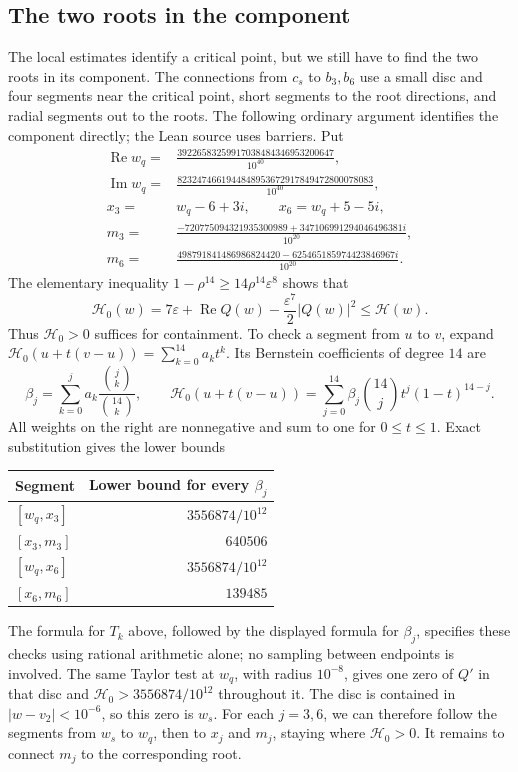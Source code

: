 \subsection{The two roots in the component}\label{subsec:counterexample-connections}

The local estimates identify a critical point, but we still have to
find the two roots in its component. The connections from $c_s$ to
$b_3,b_6$ use a small disc and four segments near the critical point,
short segments to the root directions, and radial segments out to the
roots. The following ordinary argument identifies the component
directly; the Lean source uses barriers. Put
\begin{align*}
 \operatorname{Re}w_q={}&\frac{39226583259917038484346953200647}{10^{40}},\\
 \operatorname{Im}w_q={}&\frac{8232474661944848953672917849472800078083}{10^{40}},\\
 x_3={}&w_q-6+3i,\qquad x_6=w_q+5-5i,\\
 m_3={}&\frac{-720775094321935300989+347106991294046496381i}{10^{20}},\\
 m_6={}&\frac{498791841486986824420-625465185974423846967i}{10^{20}}.
\end{align*}
The elementary inequality
$1-\rho^{14}\ge14\rho^{14}\varepsilon^8$ shows that
\[
 \mathscr H_0(w)=7\varepsilon+\operatorname{Re}Q(w)
                  -\frac{\varepsilon^7}{2}|Q(w)|^2
 \le\mathscr H(w).
\]
Thus $\mathscr H_0>0$ suffices for containment. To check a segment from
$u$ to $v$, expand
$\mathscr H_0(u+t(v-u))=\sum_{k=0}^{14}a_kt^k$. Its Bernstein
coefficients of degree $14$ are
\[
 \beta_j=\sum_{k=0}^j a_k\frac{{j\choose k}}{{14\choose k}},
 \qquad
 \mathscr H_0(u+t(v-u))
   =\sum_{j=0}^{14}\beta_j{14\choose j}t^j(1-t)^{14-j}.
\]
All weights on the right are nonnegative and sum to one for $0\le t\le1$.
Exact substitution gives the lower bounds
\begin{center}
\begin{tabular}{@{}lr@{}}
\toprule
Segment & Lower bound for every $\beta_j$\\
\midrule
$[w_q,x_3]$ & $3556874/10^{12}$\\
$[x_3,m_3]$ & $640506$\\
$[w_q,x_6]$ & $3556874/10^{12}$\\
$[x_6,m_6]$ & $139485$\\
\bottomrule
\end{tabular}
\end{center}
The formula for $T_k$ above, followed by the displayed formula for
$\beta_j$, specifies these checks using rational arithmetic alone; no
sampling between endpoints is involved. The same Taylor test at $w_q$,
with radius $10^{-8}$, gives one zero of $Q'$ in that disc and
$\mathscr H_0>3556874/10^{12}$ throughout it. The disc is contained in
$|w-v_2|<10^{-6}$, so this zero is $w_s$.
For each $j=3,6$, we can therefore follow the segments from $w_s$ to
$w_q$, then to $x_j$ and $m_j$, staying where $\mathscr H_0>0$.
It remains to connect $m_j$ to the corresponding root.


